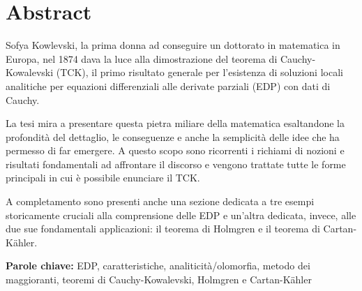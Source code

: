 \chapter*{Abstract}

Sofya Kowlevski, la prima donna ad conseguire un dottorato in matematica in Europa, nel 1874 dava la luce alla dimostrazione del teorema di Cauchy-Kowalevski (TCK), il primo risultato generale per l'esistenza di soluzioni locali analitiche per equazioni differenziali alle derivate parziali (EDP) con dati di Cauchy.

\vspace{6mm}
La tesi mira a presentare questa pietra miliare della matematica esaltandone la profondità del dettaglio, le conseguenze e anche la semplicità delle idee che ha permesso di far emergere. A questo scopo sono ricorrenti i richiami di nozioni e risultati fondamentali ad affrontare il discorso e vengono trattate tutte le forme principali in cui è possibile enunciare il TCK.

\vspace{6mm}
A completamento sono presenti anche una sezione dedicata a tre esempi storicamente cruciali alla comprensione delle EDP e un'altra dedicata, invece, alle due sue fondamentali applicazioni: il teorema di Holmgren e il teorema di Cartan-Kähler.

\vspace{6mm}
\textbf{Parole chiave:} EDP, caratteristiche, analiticità/olomorfia, metodo dei maggioranti, teoremi di Cauchy-Kowalevski, Holmgren e Cartan-Kähler

\newpage
\blankpage
